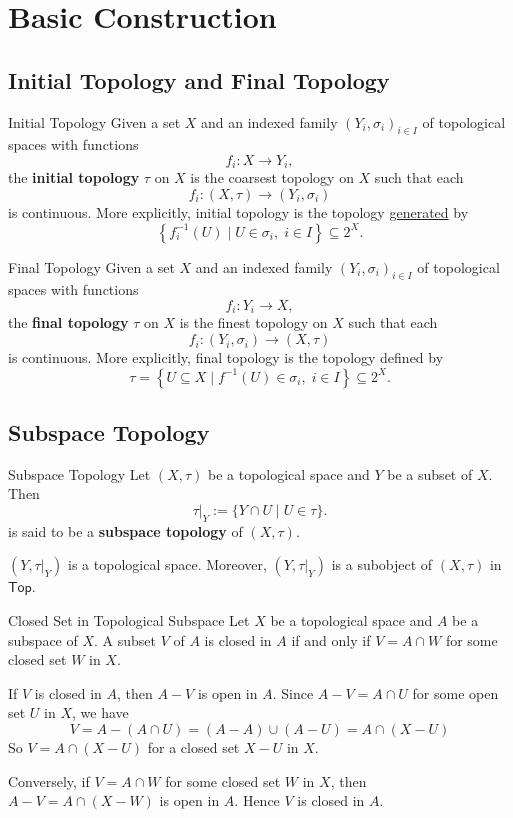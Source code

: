 \documentclass{report}
\newcommand{\Top}{\mathsf{Top}}
\begin{document}
\section{Basic Construction}
\subsection{Initial Topology and Final Topology}
\begin{definition}{Initial Topology}{}
	Given a set $X$ and an indexed family $\left(Y_i, \sigma_i\right)_{i \in I}$ of topological spaces with functions
	$$
	f_i: X \rightarrow Y_i,
	$$
	the \textbf{initial topology} $\tau$ on $X$ is the coarsest topology on $X$ such that each
	$$
	f_i:(X, \tau) \rightarrow (Y_i, \sigma_i)
	$$
	is continuous. More explicitly, initial topology is the topology \hyperref[th:generated_topology]{generated} by 
	\[
	\left\{ f^{-1}_i(U) \mid U\in \sigma_i, \;i \in I \right\}\subseteq 2^X.
	\]
\end{definition}


\begin{definition}{Final Topology}{}
	Given a set $X$ and an indexed family $\left(Y_i, \sigma_i\right)_{i \in I}$ of topological spaces with functions
	$$
	f_i: Y_i \rightarrow X,
	$$
	the \textbf{final topology} $\tau$ on $X$ is the finest topology on $X$ such that each
	$$
	f_i:(Y_i, \sigma_i) \rightarrow (X, \tau)
	$$
	is continuous. More explicitly, final topology is the topology defined by
	\[
		\tau=\left\{ U\subseteq X \mid f^{-1}(U)\in \sigma_i, \;i \in I \right\}\subseteq 2^X.
	\]
\end{definition}

\subsection{Subspace Topology}
\begin{definition}{Subspace Topology}{}
	Let $(X,\tau)$ be a topological space and $Y$ be a subset of $X$. Then
	\[
		\tau |_Y:=\{Y\cap U\mid U\in \tau\}.
	\]
	is said to be a \textbf{subspace topology} of $(X,\tau)$.
\end{definition}

$(Y,\tau |_Y)$ is a topological space. Moreover, $(Y,\tau |_Y)$ is a subobject of $(X,\tau)$ in $\Top$.


\begin{proposition}{Closed Set in Topological Subspace}{}
	Let $X$ be a topological space and $A$ be a subspace of $X$. A subset $V$ of $A$ is closed in $A$ if and only if $V=A\cap W$ for some closed set $W$ in $X$.
\end{proposition}
\begin{prf}
	If $V$ is closed in $A$, then $A-V$ is open in $A$. Since $A-V=A\cap U$ for some open set $U$ in $X$, we have 
	\[
		V=A-\left(A\cap U\right)=(A-A)\cup \left(A-U\right)=A\cap (X-U)
	\]
	So $V=A\cap (X-U)$ for a closed set $X-U$ in $X$.

	Conversely, if $V=A\cap W$ for some closed set $W$ in $X$, then $A-V=A\cap (X-W)$ is open in $A$. Hence $V$ is closed in $A$.
\end{prf}
\end{document}
